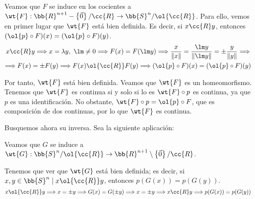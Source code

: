 \begin{ejemplo}
\begin{enumerate}
        Veamos que $F$ se induce en los cocientes a $\wt{F}:\bb{R}^{n+1}-\left\{\vec{0}\right\}/\cc{R}\to \bb{S}^n/\ol{\cc{R}}$. Para ello, vemos en primer lugar que $\wt{F}$ está bien definida. Es decir, si $x\cc{R}y$, entonces $(\ol{p}\circ F)(x) = (\ol{p}\circ F)(y)$.
        \begin{multline*}
            x\cc{R}y \Longrightarrow x=\lambda y,~\lm \neq 0 \Longrightarrow F(x)=F(\lm y) \Longrightarrow \frac{x}{\|x\|} = \frac{\lm y}{\|\lm y\|} = \pm \frac{y}{\|y\|} \Longrightarrow \\ \Longrightarrow F(x) = \pm F(y) \Longrightarrow F(x)\ol{\cc{R}}F(y) \Longrightarrow (\ol{p}\circ F)(x) = (\ol{p}\circ F)(y)
        \end{multline*}

        Por tanto, $\wt{F}$ está bien definida. Veamos que $\wt{F}$ es un homeomorfismo. Tenemos que $\wt{F}$ es continua si y solo si lo es $\wt{F}\circ p$ es continua, ya que $p$ es una identificación. No obstante, $\wt{F}\circ p = \ol{p}\circ F$, que es composición de dos continuas, por lo que $\wt{F}$ es continua.


        Busquemos ahora su inversa. Sea la siguiente aplicación:

        Veamos que $G$ se induce a $\wt{G}:\bb{S}^n/\ol{\cc{R}}\to \bb{R}^{n+1}\setminus \left\{\vec{0}\right\}/\cc{R}$.
        \begin{figure}[H]
            \centering
        \end{figure}
        Tenemos que ver que $\wt{G}$ está bien definida; es decir, si $x,y\in \bb{S}^n\mid x\ol{\cc{R}}y$, entonces $p(G(x))=p(G(y))$.
        \begin{equation*}
            x\ol{\cc{R}}y \Longrightarrow x=\pm y\Longrightarrow G(x) = G(\pm y)\Longrightarrow x=\pm y \Longrightarrow x\cc{R}y \Longrightarrow p(G(x)) = p(G(y))
        \end{equation*}


\end{enumerate}
\end{ejemplo}
